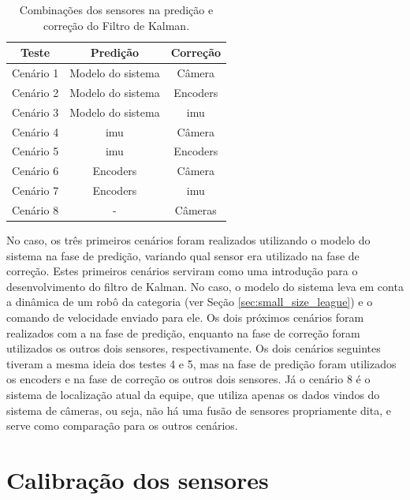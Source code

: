 \documentclass[acronym, symbols, table]{fei}
\begin{document}
		\begin{table}[!htb]
			\centering
			\caption{Combinações dos sensores na predição e correção do Filtro de Kalman.}
			\label{tbl:combinacao_sensores}
			\begin{tabular}{|c|c|c|}
				\hline
				\textbf{Teste}   & \textbf{Predição} & \textbf{Correção} \\ \hline
				Cenário 1 		 & Modelo do sistema & Câmera   		 \\ \hline
				Cenário 2 		 & Modelo do sistema & Encoders 		 \\ \hline
				Cenário 3 		 & Modelo do sistema & \acrshort{imu} 	 \\ \hline
				Cenário 4 		 & \acrshort{imu}    & Câmera   		 \\ \hline
				Cenário 5 		 & \acrshort{imu}    & Encoders 		 \\ \hline
				Cenário 6 		 & Encoders          & Câmera   		 \\ \hline
				Cenário 7 		 & Encoders          & \acrshort{imu} 	 \\ \hline
				Cenário 8 		 & - 			 	 & Câmeras 			 \\ \hline
			\end{tabular}
		\end{table}
		
		No caso, os três primeiros cenários foram realizados utilizando o modelo do sistema na fase de predição, variando qual sensor era utilizado na fase de correção. Estes primeiros cenários serviram como uma introdução para o desenvolvimento do filtro de Kalman. No caso, o modelo do sistema leva em conta a dinâmica de um robô da categoria  (ver Seção \ref{sec:small_size_league}) e o comando de velocidade enviado para ele. Os dois próximos cenários foram realizados com a  na fase de predição, enquanto na fase de correção foram utilizados os outros dois sensores, respectivamente. Os dois cenários seguintes tiveram a mesma ideia dos testes 4 e 5, mas na fase de predição foram utilizados os encoders e na fase de correção os outros dois sensores. Já o cenário 8 é o sistema de localização atual da equipe, que utiliza apenas os dados vindos do sistema de câmeras, ou seja, não há uma fusão de sensores propriamente dita, e serve como comparação para os outros cenários.
		
	\section{Calibração dos sensores} \label{sec:metodologia_calibracao}
	
\end{document}
